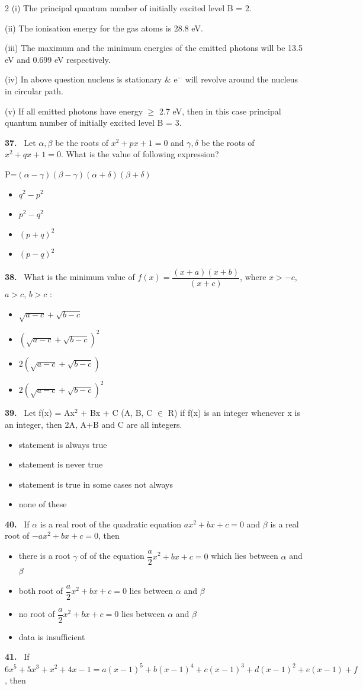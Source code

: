 \documentclass[10pt]{extarticle}
\newcommand{\papersec}[1]{\par\bigskip{\centering\Large\bfseries PAPER-#1\par}\medskip}
\newcommand{\partsec}[2]{\par\medskip\noindent{\large\bfseries PART-#1: #2}\par\smallskip}
\newcommand{\qn}[1]{\par\smallskip\noindent\textbf{#1.}~}
\newenvironment{qoptions}{\begin{itemize}[leftmargin=1.8em,itemsep=1pt,topsep=2pt,label={}]}{\end{itemize}}
\newcommand{\opt}[2]{\item[(#1)] #2}
\begin{document}
\begin{multicols}{2}
(i) \quad The principal quantum number of initially excited level B = 2.\par
(ii) \quad The ionisation energy for the gas atoms is 28.8 eV.\par
(iii) \quad The maximum and the minimum energies of the emitted photons will be 13.5 eV and 0.699 eV respectively.\par
(iv) \quad In above question nucleus is stationary \& e$^-$ will revolve around the nucleus in circular path.\par
(v) \quad If all emitted photons have energy $\ge$ 2.7 eV, then in this case principal quantum number of initially excited level B = 3.
\raggedcolumns
\papersec{1}
\partsec{3}{MATHEMATICS}
\qn{37} Let $\alpha,\beta$ be the roots of $x^2+px+1=0$ and $\gamma,\delta$ be the roots of $x^2+qx+1=0$. What is the value of following expression?\par
P=$(\alpha-\gamma)(\beta-\gamma)(\alpha+\delta)(\beta+\delta)$
\begin{qoptions}
\opt{A}{$q^2-p^2$}
\opt{B}{$p^2-q^2$}
\opt{C}{$(p+q)^2$}
\opt{D}{$(p-q)^2$}
\end{qoptions}
\qn{38} What is the minimum value of $f(x)=\dfrac{(x+a)(x+b)}{(x+c)}$, where $x>-c$, $a>c$, $b>c$ :
\begin{qoptions}
\opt{A}{$\sqrt{a-c}+\sqrt{b-c}$}
\opt{B}{$\left(\sqrt{a-c}+\sqrt{b-c}\right)^2$}
\opt{C}{$2\left(\sqrt{a-c}+\sqrt{b-c}\right)$}
\opt{D}{$2\left(\sqrt{a-c}+\sqrt{b-c}\right)^2$}
\end{qoptions}
\qn{39} Let f(x) = Ax$^2$ + Bx + C (A, B, C $\in$ R) if f(x) is an integer whenever x is an integer, then 2A, A+B and C are all integers.
\begin{qoptions}
\opt{A}{statement is always true}
\opt{B}{statement is never true}
\opt{C}{statement is true in some cases not always}
\opt{D}{none of these}
\end{qoptions}
\qn{40} If $\alpha$ is a real root of the quadratic equation $ax^2+bx+c=0$ and $\beta$ is a real root of $-ax^2+bx+c=0$, then
\begin{qoptions}
\opt{A}{there is a root $\gamma$ of of the equation $\dfrac a2x^2+bx+c=0$ which lies between $\alpha$ and $\beta$}
\opt{B}{both root of $\dfrac a2x^2+bx+c=0$ lies between $\alpha$ and $\beta$}
\opt{C}{no root of $\dfrac a2x^2+bx+c=0$ lies between $\alpha$ and $\beta$}
\opt{D}{data is insufficient}
\end{qoptions}
\qn{41} If $6x^5+5x^3+x^2+4x-1=a(x-1)^5+b(x-1)^4+c(x-1)^3+d(x-1)^2+e(x-1)+f$, then
\begin{qoptions}

\end{qoptions}
\end{multicols}
\end{document}
